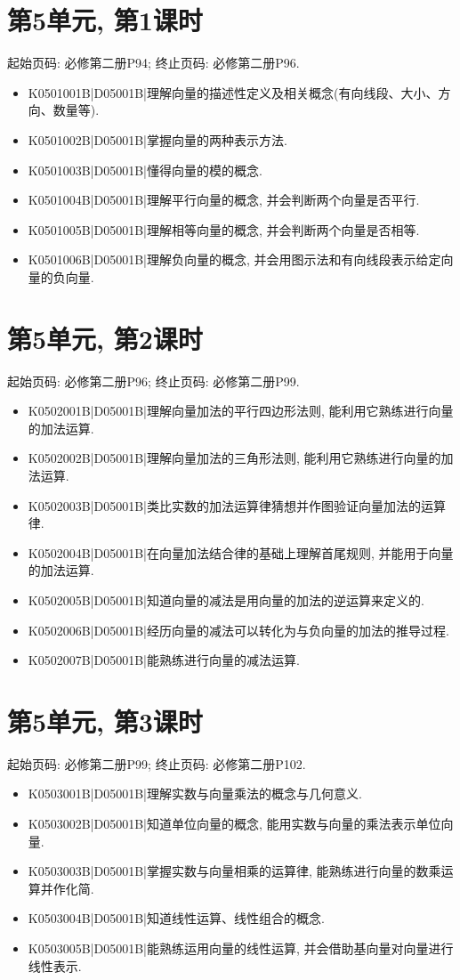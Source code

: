\section*{第5单元, 第1课时}
起始页码: 必修第二册P94; 终止页码: 必修第二册P96.
\begin{itemize}
\item K0501001B|D05001B|理解向量的描述性定义及相关概念(有向线段、大小、方向、数量等).
\item K0501002B|D05001B|掌握向量的两种表示方法.
\item K0501003B|D05001B|懂得向量的模的概念.
\item K0501004B|D05001B|理解平行向量的概念, 并会判断两个向量是否平行.
\item K0501005B|D05001B|理解相等向量的概念, 并会判断两个向量是否相等.
\item K0501006B|D05001B|理解负向量的概念, 并会用图示法和有向线段表示给定向量的负向量.
\end{itemize}

\section*{第5单元, 第2课时}
起始页码: 必修第二册P96; 终止页码: 必修第二册P99.
\begin{itemize}
\item K0502001B|D05001B|理解向量加法的平行四边形法则, 能利用它熟练进行向量的加法运算.
\item K0502002B|D05001B|理解向量加法的三角形法则, 能利用它熟练进行向量的加法运算.
\item K0502003B|D05001B|类比实数的加法运算律猜想并作图验证向量加法的运算律.
\item K0502004B|D05001B|在向量加法结合律的基础上理解首尾规则, 并能用于向量的加法运算.
\item K0502005B|D05001B|知道向量的减法是用向量的加法的逆运算来定义的.
\item K0502006B|D05001B|经历向量的减法可以转化为与负向量的加法的推导过程.
\item K0502007B|D05001B|能熟练进行向量的减法运算.
\end{itemize}

\section*{第5单元, 第3课时}
起始页码: 必修第二册P99; 终止页码: 必修第二册P102.
\begin{itemize}
\item K0503001B|D05001B|理解实数与向量乘法的概念与几何意义.
\item K0503002B|D05001B|知道单位向量的概念, 能用实数与向量的乘法表示单位向量.
\item K0503003B|D05001B|掌握实数与向量相乘的运算律, 能熟练进行向量的数乘运算并作化简.
\item K0503004B|D05001B|知道线性运算、线性组合的概念.
\item K0503005B|D05001B|能熟练运用向量的线性运算, 并会借助基向量对向量进行线性表示.
\end{itemize}

